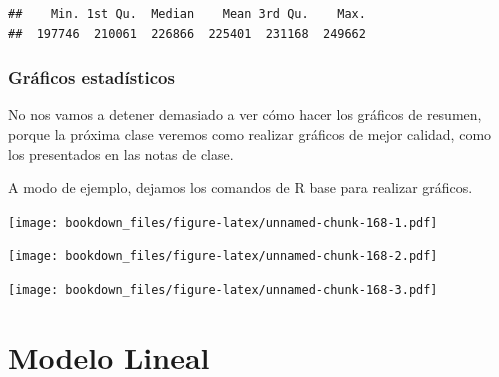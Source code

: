 \documentclass[]{book}
\newenvironment{Shaded}{\begin{snugshade}}{\end{snugshade}}
\newcommand{\KeywordTok}[1]{\textcolor[rgb]{0.13,0.29,0.53}{\textbf{#1}}}
\newcommand{\NormalTok}[1]{#1}
\newcommand{\OperatorTok}[1]{\textcolor[rgb]{0.81,0.36,0.00}{\textbf{#1}}}
\begin{document}
\begin{verbatim}
##    Min. 1st Qu.  Median    Mean 3rd Qu.    Max. 
##  197746  210061  226866  225401  231168  249662
\end{verbatim}

\hypertarget{graficos-estadisticos-1}{%
\subsection{Gráficos estadísticos}\label{graficos-estadisticos-1}}

No nos vamos a detener demasiado a ver cómo hacer los gráficos de resumen, porque la próxima clase veremos como realizar gráficos de mejor calidad, como los presentados en las notas de clase.

A modo de ejemplo, dejamos los comandos de R base para realizar gráficos.

\begin{Shaded}
\end{Shaded}

\texttt{[image: bookdown\_files/figure-latex/unnamed-chunk-168-1.pdf]}

\begin{Shaded}
\end{Shaded}

\texttt{[image: bookdown\_files/figure-latex/unnamed-chunk-168-2.pdf]}

\begin{Shaded}
\end{Shaded}

\texttt{[image: bookdown\_files/figure-latex/unnamed-chunk-168-3.pdf]}

\hypertarget{modelo-lineal}{%
\chapter{Modelo Lineal}\label{modelo-lineal}}
\end{document}
